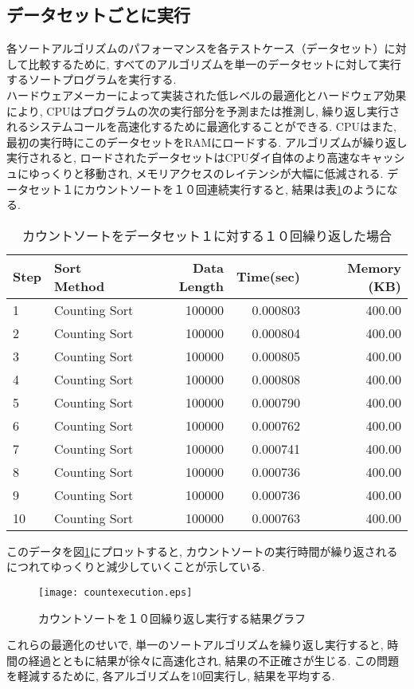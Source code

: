 \documentclass[a4j, 12pt]{jarticle}
\begin{document}
\subsection{データセットごとに実行}
各ソートアルゴリズムのパフォーマンスを各テストケース（データセット）に対して比較するために, すべてのアルゴリズムを単一のデータセットに対して実行するソートプログラムを実行する. \\
ハードウェアメーカーによって実装された低レベルの最適化とハードウェア効果により, CPUはプログラムの次の実行部分を予測または推測し, 繰り返し実行されるシステムコールを高速化するために最適化することができる\cite{mittal2018branch}. CPUはまた, 最初の実行時にこのデータセットをRAMにロードする. アルゴリズムが繰り返し実行されると, ロードされたデータセットはCPUダイ自体のより高速なキャッシュにゆっくりと移動され, メモリアクセスのレイテンシが大幅に低減される\cite{apple2023siliconcpuopt}. データセット１にカウントソートを１０回連続実行すると, 結果は表\ref{repeatedsortresult}のようになる. 
\begin{table}[H]
  \centering
  \caption{カウントソートをデータセット１に対する１０回繰り返した場合}\label{repeatedsortresult}
  \begin{tabular}{|l|l|r|r|r|}
    \hline
    \textbf{Step} & \textbf{Sort Method} & \textbf{Data Length} & \textbf{Time(sec)} & \textbf{Memory (KB)} \\
    \hline
    1 & Counting Sort & 100000 & 0.000803 & 400.00 \\
    2 & Counting Sort & 100000 & 0.000804 & 400.00 \\
    3 & Counting Sort & 100000 & 0.000805 & 400.00 \\
    4 & Counting Sort & 100000 & 0.000808 & 400.00 \\
    5 & Counting Sort & 100000 & 0.000790 & 400.00 \\
    6 & Counting Sort & 100000 & 0.000762 & 400.00 \\
    7 & Counting Sort & 100000 & 0.000741 & 400.00 \\
    8 & Counting Sort & 100000 & 0.000736 & 400.00 \\
    9 & Counting Sort & 100000 & 0.000736 & 400.00 \\
    10 & Counting Sort & 100000 & 0.000763 & 400.00 \\
    \hline
  \end{tabular}
\end{table}
このデータを図\ref{repeatedsortgraph}にプロットすると, カウントソートの実行時間が繰り返されるにつれてゆっくりと減少していくことが示している. \\
\begin{figure}[H]
  \centering
  \texttt{[image: countexecution.eps]}
  \caption{カウントソートを１０回繰り返し実行する結果グラフ}\label{repeatedsortgraph}
\end{figure}
これらの最適化のせいで, 単一のソートアルゴリズムを繰り返し実行すると, 時間の経過とともに結果が徐々に高速化され, 結果の不正確さが生じる. この問題を軽減するために, 各アルゴリズムを10回実行し, 結果を平均する. \
\newpage
\end{document}

